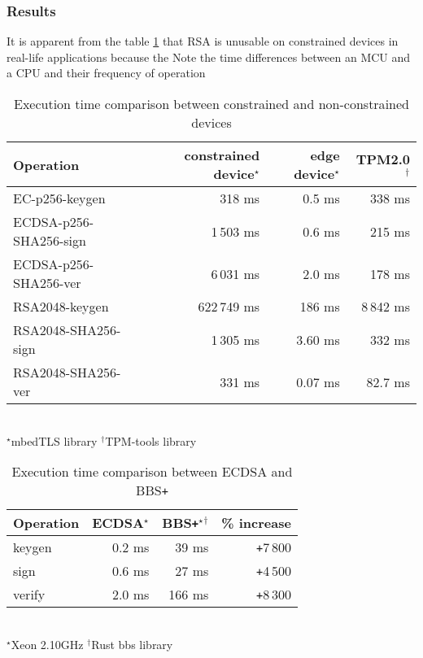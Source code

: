 \subsubsection*{Results}
It is apparent from the table \ref{time-table1} that RSA is unusable on constrained devices in real-life applications because the   Note the time differences between an MCU and a CPU and their frequency of operation

\begin{table}[!h]
    \centering
    \begin{tabular}{| l || r | r | r |}
        \hline      
        \textbf{Operation} & \textbf{constrained device}$^\star$ & \textbf{edge device}$^\star$  & \textbf{TPM2.0}$^\dagger$\\ [0.5ex] 
        \hline \hline 
        EC-p256-keygen                  & 318 ms  & 0.5 ms & 338  ms  \\
        \hline
        ECDSA-p256-SHA256-sign          & 1\,503 ms & 0.6 ms & 215  ms  \\
        \hline
        ECDSA-p256-SHA256-ver           & 6\,031 ms & 2.0 ms & 178  ms  \\
        \hline \hline
        RSA2048-keygen                  & 622\,749 ms  & 186  ms & 8\,842 ms   \\
        \hline
        RSA2048-SHA256-sign          & 1\,305 ms & 3.60 ms & 332  ms  \\
        \hline
        RSA2048-SHA256-ver           & 331 ms & 0.07  ms  & 82.7 ms  \\
        \hline
    \end{tabular}\\
    \footnotesize $^\star$mbedTLS library \enspace\enspace $^\dagger$TPM-tools library
    \caption{Execution time comparison between constrained and non-constrained devices}
    \label{time-table1}
\end{table}

   
\begin{table}[!h]
    \centering
    \begin{tabular}{| l || r | r | r|}
        \hline 
        \textbf{Operation} & \textbf{ECDSA}$^\star$ & \textbf{BBS\texttt{+}}$^\star$$^\dagger$ & \textbf{\% increase} \\ [0.5ex] 
        \hline  \hline 
        keygen   & 0.2   ms      & 39 ms   &\texttt{+}7\,800\\
        \hline
        sign     & 0.6   ms      & 27  ms   &\texttt{+}4\,500\\
        \hline
        verify   & 2.0  ms         & 166 ms   &\texttt{+}8\,300\\
        \hline
    \end{tabular}
    \\
    \footnotesize $^\star$Xeon 2.10GHz \enspace\enspace $^\dagger$Rust bbs library
    \caption{Execution time comparison between ECDSA and BBS\texttt{+}}
    \label{time-table2}
\end{table}
    


